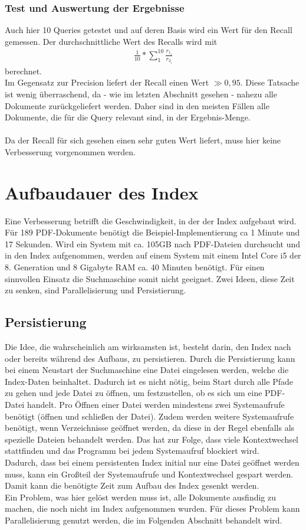 \subsubsection{Test und Auswertung der Ergebnisse}
Auch hier 10 Queries getestet und auf deren Basis wird ein Wert für den Recall gemessen. 
Der durchschnittliche Wert des Recalls wird mit 
\begin{align}
	\frac{1}{10} * \sum_{1}^{10} \frac{r_{1_i}}{r_{2_i}}
\end{align}
berechnet.
\\
Im Gegensatz zur Precision liefert der Recall einen Wert $\gg 0,95$. Diese Tatsache ist wenig überraschend, da - wie im letzten Abschnitt gesehen - nahezu alle Dokumente zurückgeliefert werden. Daher sind in den meisten Fällen alle Dokumente, die für die Query relevant sind, in der Ergebnis-Menge.
\\
\\
Da der Recall für sich gesehen einen sehr guten Wert liefert, muss hier keine Verbesserung vorgenommen werden.

\section{Aufbaudauer des Index}
Eine Verbesserung betrifft die Geschwindigkeit, in der der Index aufgebaut wird. Für 189 PDF-Dokumente benötigt die Beispiel-Implementierung ca 1 Minute und 17 Sekunden.
Wird ein System mit ca. 105GB nach PDF-Dateien durchsucht und in den Index aufgenommen, werden auf einem System mit einem Intel Core i5 der 8. Generation und 8 Gigabyte RAM ca. 40 Minuten benötigt. Für einen sinnvollen Einsatz die Suchmaschine somit nicht geeignet. Zwei Ideen, diese Zeit zu senken, sind Parallelisierung und Persistierung.

\subsection{Persistierung}
Die Idee, die wahrscheinlich am wirksamsten ist, besteht darin, den Index nach oder bereits während des Aufbaus,  zu persistieren. Durch die Persistierung kann bei einem Neustart der Suchmaschine eine Datei eingelesen werden, welche die Index-Daten beinhaltet. Dadurch ist es nicht nötig, beim Start durch alle Pfade zu gehen und jede Datei zu öffnen, um festzustellen, ob es sich um eine PDF-Datei handelt. Pro Öffnen einer Datei werden mindestens zwei Systemaufrufe benötigt (öffnen und schließen der Datei). Zudem werden weitere Systemaufrufe benötigt, wenn Verzeichnisse geöffnet werden, da diese in der Regel ebenfalls als spezielle Dateien behandelt werden. Das hat zur Folge, dass viele Kontextwechsel stattfinden und das Programm bei jedem Systemaufruf blockiert wird.
\\
Dadurch, dass bei einem persistenten Index initial nur eine Datei geöffnet werden muss, kann ein Großteil der Systemaufrufe und Kontextwechsel gespart werden. Damit kann die benötigte Zeit zum Aufbau des Index gesenkt werden.
\\
Ein Problem, was hier gelöst werden muss ist, alle Dokumente ausfindig zu machen, die noch nicht im Index aufgenommen wurden. Für dieses Problem kann Parallelisierung genutzt werden, die im Folgenden Abschnitt behandelt wird.

